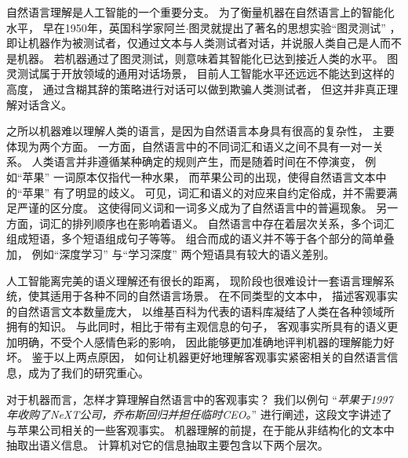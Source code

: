自然语言理解是人工智能的一个重要分支。
为了衡量机器在自然语言上的智能化水平，
早在1950年，英国科学家阿兰$\cdot$图灵就提出了著名的思想实验``{图灵测试}'' ，
即让机器作为被测试者，仅通过文本与人类测试者对话，并说服人类自己是人而不是机器。
若机器通过了图灵测试，则意味着其智能化已达到接近人类的水平。
图灵测试属于开放领域的通用对话场景，
目前人工智能水平还远远不能达到这样的高度，
通过含糊其辞的策略进行对话可以做到欺骗人类测试者，
但这并非真正理解对话含义。

之所以机器难以理解人类的语言，是因为自然语言本身具有很高的复杂性，
主要体现为两个方面。
一方面，自然语言中的不同词汇和语义之间不具有一对一关系。
人类语言并非遵循某种确定的规则产生，而是随着时间在不停演变，
例如``{苹果}'' 一词原本仅指代一种水果，
而苹果公司的出现，使得自然语言文本中的``{苹果}'' 有了明显的歧义。
可见，词汇和语义的对应来自约定俗成，并不需要满足严谨的区分度。
这使得同义词和一词多义成为了自然语言中的普遍现象。
另一方面，词汇的排列顺序也在影响着语义。
自然语言中存在着层次关系，多个词汇组成短语，多个短语组成句子等等。
组合而成的语义并不等于各个部分的简单叠加，
例如``{深度学习}'' 与``{学习深度}'' 两个短语具有较大的语义差别。



人工智能离完美的语义理解还有很长的距离，
现阶段也很难设计一套语言理解系统，使其适用于各种不同的自然语言场景。
在不同类型的文本中，
描述客观事实的自然语言文本数量庞大，
以维基百科为代表的语料库凝结了人类在各种领域所拥有的知识。
与此同时，相比于带有主观信息的句子，
客观事实所具有的语义更加明确，不受个人感情色彩的影响，
因此能够更加准确地评判机器的理解能力好坏。
鉴于以上两点原因，
如何让机器更好地理解客观事实紧密相关的自然语言信息，成为了我们的研究重心。


对于机器而言，怎样才算理解自然语言中的客观事实？
我们以例句
``\textit{苹果于1997年收购了NeXT公司，乔布斯回归并担任临时CEO。}''
进行阐述，这段文字讲述了与苹果公司相关的一些客观事实。
机器理解的前提，在于能从非结构化的文本中抽取出语义信息。
计算机对它的信息抽取主要包含以下两个层次。

